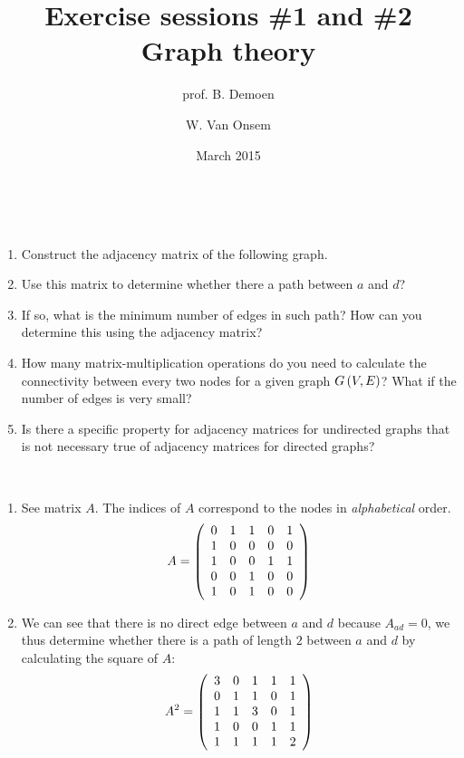 \documentclass{article}
\title{Exercise sessions \#1 and \#2\\Graph theory}
\author{prof. B. Demoen\and W. Van Onsem}
\date{March 2015}
\begin{document}
\maketitle
\begin{exercise}~~
\begin{enumerate}
 \item Construct the adjacency matrix of the following graph.
 \item Use this matrix to determine whether there a path between $a$ and $d$?
 \item If so, what is the minimum number of edges in such path? How can you determine this using the adjacency matrix?
 \item How many matrix-multiplication operations do you need to calculate the connectivity between every two nodes for a given graph $G\left( V,E \right)$? What if the number of edges is very small?
 \item Is there a specific property for adjacency matrices for undirected graphs that is not necessary true of adjacency matrices for directed graphs?
\end{enumerate}
\begin{answer}~~
\begin{enumerate}
 \item See matrix $A$. The indices of $A$ correspond to the nodes in \emph{alphabetical} order.
 \begin{equation}
  A=\left( \begin{array}{ccccc}0&1&1&0&1\\1&0&0&0&0\\1&0&0&1&1\\0&0&1&0&0\\1&0&1&0&0\end{array} \right)
 \end{equation}
 \item We can see that there is no direct edge between $a$ and $d$ because $A_{ad}=0$, we thus determine whether there is a path of length $2$ between $a$ and $d$ by calculating the square of $A$:
 \begin{equation}
  A^2=\left( \begin{array}{ccccc}3&0&1&1&1\\0&1&1&0&1\\1&1&3&0&1\\1&0&0&1&1\\1&1&1&1&2\end{array} \right)
 \end{equation}

\end{enumerate}
\end{answer}
\end{exercise}
\end{document}
